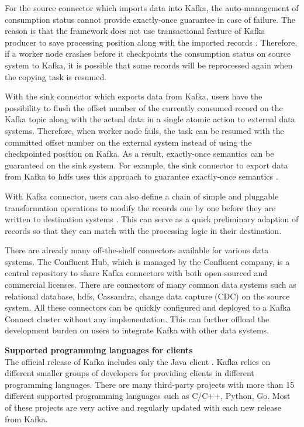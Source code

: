 For the source connector which imports data into Kafka, the auto-management of consumption status cannot provide exactly-once guarantee in case of failure. The reason is that the framework does not use transactional feature of Kafka producer to save processing position along with the imported records \cite{kafkaconnectsource}. Therefore, if a worker node crashes before it checkpoints the consumption status on source system to Kafka, it is possible that some records will be reprocessed again when the copying task is resumed. 

With the sink connector which exports data from Kafka, users have the possibility to flush the offset number of the currently consumed record on the Kafka topic along with the actual data in a single atomic action to external data systems. Therefore, when worker node fails, the task can be resumed with the committed offset number on the external system instead of using the checkpointed position on Kafka. As a result, exactly-once semantics can be guaranteed on the sink system. For example, the sink connector to export data from Kafka to \acrfull{hdfs} uses this approach to guarantee exactly-once semantics \cite{kafkahdfsconnector}.


With Kafka connector, users can also define a chain of simple and pluggable transformation operations to modify the records one by one before they are written to destination systems \cite{kafkaconnect}. This can serve as a quick preliminary adaption of records so that they can match with the processing logic in their destination.

There are already many off-the-shelf connectors available for various data systems. The Confluent Hub, which is managed by the Confluent company, is a central repository to share Kafka connectors with both open-sourced and commercial licenses. There are connectors of many common data systems such as relational database, \acrshort{hdfs}, Cassandra, change data capture (CDC) on the source system. All these connectors can be quickly configured and deployed to a Kafka Connect cluster without any implementation. This can further offload the development burden on users to integrate Kafka with other data systems.

\newpage

\textbf{Supported programming languages for clients}\\
The official release of Kafka includes only the Java client \cite{kafkaclients}. Kafka relies on different smaller groups of developers for providing clients in different programming languages. There are many third-party projects with more than 15 different supported programming languages such as C/C++, Python, Go. Most of these projects are very active and regularly updated with each new release from Kafka.  

